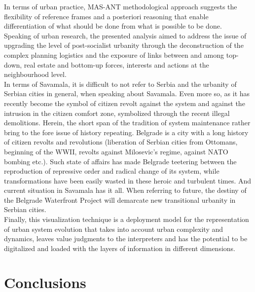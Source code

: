 \documentclass[11pt]{report}
\begin{document}
In terms of urban practice, MAS-ANT methodological approach suggests the flexibility of reference frames and a posteriori reasoning that enable differentiation of what should be done from what is possible to be done.
\\

Speaking of urban research, the presented analysis aimed to address the issue of upgrading the level of post-socialist urbanity through the deconstruction of the complex planning logistics and the exposure of links between and among top-down, real estate and bottom-up forces, interests and actions at the neighbourhood level.
\\
 
In terms of Savamala, it is difficult to not refer to Serbia and the urbanity of Serbian cities in general, when speaking about Savamala. Even more so, as it has recently become the symbol of citizen revolt against the system and against the intrusion in the citizen comfort zone, symbolized through the recent illegal demolitions. 
Herein, the short span of the tradition of system maintenance rather bring to the fore issue of history repeating. Belgrade is a city with a long history of citizen revolts and revolutions (liberation of Serbian cities from Ottomans, beginning of the WWII, revolts against Milosevic's regime, against NATO bombing etc.).
Such state of affairs has made Belgrade teetering between the reproduction of repressive order and radical change of its system, while transformations have been easily wasted in these heroic and turbulent times.
And current situation in Savamala has it all.
When referring to future, the destiny of the Belgrade Waterfront Project will demarcate new transitional urbanity in Serbian cities.
\\

Finally, this visualization technique is a deployment model for the representation of urban system evolution that takes into account urban complexity and dynamics, leaves value judgments to the interpreters and has the potential to be digitalized and loaded with the layers of information in different dimensions.


\chapter{Conclusions}

\end{document}
